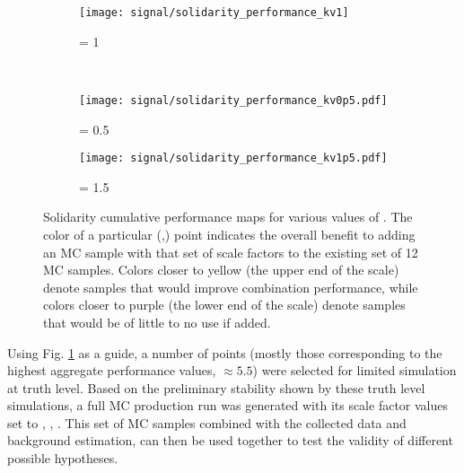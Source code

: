     \begin{figure}[tbh]
        \begin{subfigure}{0.5\textwidth}
            \texttt{[image: signal/solidarity\_performance\_kv1]}
            \captionsetup{justification=centering} \caption{\kv = 1}
        \end{subfigure}\\
        \begin{subfigure}{0.5\textwidth}
            \texttt{[image: signal/solidarity\_performance\_kv0p5.pdf]}
            \captionsetup{justification=centering} \caption{\kv = 0.5}
        \end{subfigure}
        \begin{subfigure}{0.5\textwidth}
            \texttt{[image: signal/solidarity\_performance\_kv1p5.pdf]}
            \captionsetup{justification=centering} \caption{\kv = 1.5}
        \end{subfigure}
        \caption{
            Solidarity cumulative performance maps for various values of \kv.
            The color of a particular (\kvv,\kl) point indicates the overall
                benefit to adding an MC sample with that set of scale factors
                to the existing set of 12 MC samples.
            Colors closer to yellow (the upper end of the scale) denote samples that would improve combination performance,
                while colors closer to purple (the lower end of the scale) denote samples that would be of little to no use if added.
        }
        \label{fig:solidarity_performance_map}
    \end{figure}
    \FloatBarrier

    Using Fig. \ref{fig:solidarity_performance_map} as a guide,
        a number of points (mostly those corresponding to the highest aggregate performance values, $\approx 5.5$)
        were selected for limited simulation at truth level.
    Based on the preliminary stability shown by these truth level simulations,
        a full MC production run was generated with its scale factor values set to , , .
    This set of MC samples combined with the collected data and background estimation,
        can then be used together to test the validity of different possible hypotheses.


%
